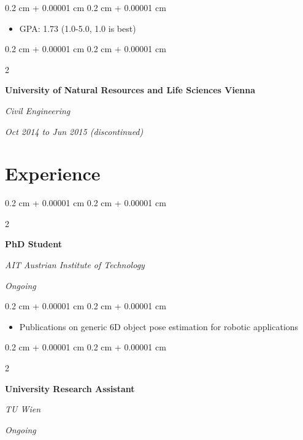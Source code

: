 \documentclass[10pt, letterpaper]{article}
\newenvironment{highlights}{
    \begin{itemize}[
        topsep=0.10 cm,
        parsep=0.10 cm,
        partopsep=0pt,
        itemsep=0pt,
        leftmargin=0.4 cm + 10pt
    ]
}{
    \end{itemize}
} %
\newenvironment{onecolentry}{
    \begin{adjustwidth}{
        0.2 cm + 0.00001 cm
    }{
        0.2 cm + 0.00001 cm
    }
}{
    \end{adjustwidth}
} %
\newenvironment{twocolentry}[2][]{
    \onecolentry
    \def\secondColumn{#2}
    \setcolumnwidth{\fill, 4.5 cm}
    \begin{paracol}{2}
}{
    \switchcolumn \raggedleft \secondColumn
    \end{paracol}
    \endonecolentry
} %
\begin{document}
        \vspace{0.10 cm}
        \begin{onecolentry}
            \begin{highlights}
                \item GPA: 1.73 (1.0-5.0, 1.0 is best)
            \end{highlights}
        \end{onecolentry}


        \vspace{0.2 cm}

        \begin{twocolentry}{
            
            
        \textit{Oct 2014 to Jun 2015 (discontinued)}}
            \textbf{University of Natural Resources and Life Sciences Vienna}

            \textit{Civil Engineering}
        \end{twocolentry}




    
    \section{Experience}



        
        \begin{twocolentry}{
            
            
        \textit{Ongoing}}
            \textbf{PhD Student}
            
            \textit{AIT Austrian Institute of Technology}
        \end{twocolentry}

        \vspace{0.10 cm}
        \begin{onecolentry}
            \begin{highlights}
                \item Publications on generic 6D object pose estimation for robotic applications
            \end{highlights}
        \end{onecolentry}


        \vspace{0.2 cm}

        \begin{twocolentry}{
            
            
        \textit{Ongoing}}
            \textbf{University Research Assistant}
            
            \textit{TU Wien}
        \end{twocolentry}
\end{document}
